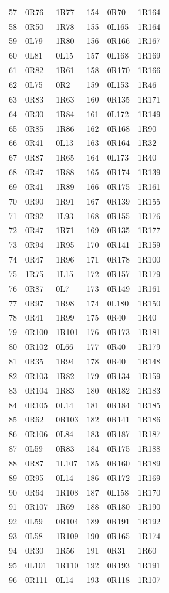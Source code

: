 \begin{longtable}{rll@{\qquad}rll}
57 & 0R76 & 1R77 & 154 & 0R70 & 1R164\\
58 & 0R50 & 1R78 & 155 & 0L165 & 1R164\\
59 & 0L79 & 1R80 & 156 & 0R166 & 1R167\\
60 & 0L81 & 0L15 & 157 & 0L168 & 1R169\\
61 & 0R82 & 1R61 & 158 & 0R170 & 1R166\\
62 & 0L75 & 0R2 & 159 & 0L153 & 1R46\\
63 & 0R83 & 1R63 & 160 & 0R135 & 1R171\\
64 & 0R30 & 1R84 & 161 & 0L172 & 1R149\\
65 & 0R85 & 1R86 & 162 & 0R168 & 1R90\\
66 & 0R41 & 0L13 & 163 & 0R164 & 1R32\\
67 & 0R87 & 1R65 & 164 & 0L173 & 1R40\\
68 & 0R47 & 1R88 & 165 & 0R174 & 1R139\\
69 & 0R41 & 1R89 & 166 & 0R175 & 1R161\\
70 & 0R90 & 1R91 & 167 & 0R139 & 1R155\\
71 & 0R92 & 1L93 & 168 & 0R155 & 1R176\\
72 & 0R47 & 1R71 & 169 & 0R135 & 1R177\\
73 & 0R94 & 1R95 & 170 & 0R141 & 1R159\\
74 & 0R47 & 1R96 & 171 & 0R178 & 1R100\\
75 & 1R75 & 1L15 & 172 & 0R157 & 1R179\\
76 & 0R87 & 0L7 & 173 & 0R149 & 1R161\\
77 & 0R97 & 1R98 & 174 & 0L180 & 1R150\\
78 & 0R41 & 1R99 & 175 & 0R40 & 1R40\\
79 & 0R100 & 1R101 & 176 & 0R173 & 1R181\\
80 & 0R102 & 0L66 & 177 & 0R40 & 1R179\\
81 & 0R35 & 1R94 & 178 & 0R40 & 1R148\\
82 & 0R103 & 1R82 & 179 & 0R134 & 1R159\\
83 & 0R104 & 1R83 & 180 & 0R182 & 1R183\\
84 & 0R105 & 0L14 & 181 & 0R184 & 1R185\\
85 & 0R62 & 0R103 & 182 & 0R141 & 1R186\\
86 & 0R106 & 0L84 & 183 & 0R187 & 1R187\\
87 & 0L59 & 0R83 & 184 & 0R175 & 1R188\\
88 & 0R87 & 1L107 & 185 & 0R160 & 1R189\\
89 & 0R95 & 0L14 & 186 & 0R172 & 1R169\\
90 & 0R64 & 1R108 & 187 & 0L158 & 1R170\\
91 & 0R107 & 1R69 & 188 & 0R180 & 1R190\\
92 & 0L59 & 0R104 & 189 & 0R191 & 1R192\\
93 & 0L58 & 1R109 & 190 & 0R165 & 1R174\\
94 & 0R30 & 1R56 & 191 & 0R31 & 1R60\\
95 & 0L101 & 1R110 & 192 & 0R193 & 1R191\\
96 & 0R111 & 0L14 & 193 & 0R118 & 1R107\\
\end{longtable}\endgroup
\clearpage
